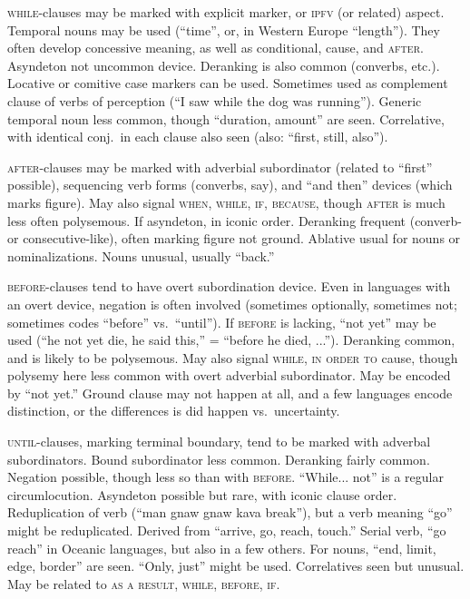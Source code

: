 \documentclass[11pt]{article}
\newcommand{\I}[1]{\textsc{#1}}   %
\begin{document}
\I{while}-clauses may be marked with explicit marker, or \I{ipfv} (or
related) aspect.  Temporal nouns may be used (``time'', or, in Western
Europe ``length'').  They often develop concessive meaning, as well as
conditional, cause, and \I{after}.  Asyndeton not uncommon device.
Deranking is also common (converbs, etc.).  Locative or comitive case
markers can be used.  Sometimes used as complement clause of verbs of
perception (``I saw while the dog was running'').  Generic temporal
noun less common, though ``duration, amount'' are seen.  Correlative,
with identical conj.\ in each clause also seen (also: ``first, still,
also'').  

\I{after}-clauses may be marked with adverbial subordinator (related
to ``first'' possible), sequencing verb forms (converbs, say), and
``and then'' devices (which marks figure).  May also signal \I{when,
while, if, because,} though \I{after} is much less often polysemous.
If asyndeton, in iconic order.  Deranking frequent (converb- or
consecutive-like), often marking figure not ground.  Ablative usual
for nouns or nominalizations.  Nouns unusual, usually ``back.''

\I{before}-clauses tend to have overt subordination device.  Even in
languages with an overt device, negation is often involved (sometimes
optionally, sometimes not; sometimes codes ``before'' vs.\ ``until'').
If \I{before} is lacking, ``not yet'' may be used (``he not yet die,
he said this,'' = ``before he died, ...'').  Deranking common, and is
likely to be polysemous.  May also signal \I{while, in order to}
cause, though polysemy here less common with overt adverbial
subordinator.  May be encoded by ``not yet.''  Ground clause may not
happen at all, and a few languages encode distinction, or the
differences is did happen vs.\ uncertainty.

\I{until}-clauses, marking terminal boundary, tend to be marked with
adverbal subordinators.  Bound subordinator less common.  Deranking
fairly common.  Negation possible, though less so than with
\I{before}.  ``While... not'' is a regular circumlocution.  Asyndeton
possible but rare, with iconic clause order.  Reduplication of verb
(``man gnaw gnaw kava break''), but a verb meaning ``go'' might be
reduplicated.  Derived from ``arrive, go, reach, touch.''  Serial
verb, ``go reach'' in Oceanic languages, but also in a few others.
For nouns, ``end, limit, edge, border'' are seen.  ``Only, just''
might be used.  Correlatives seen but unusual.  May be related to
\I{as a result, while, before, if}.
\end{document}
